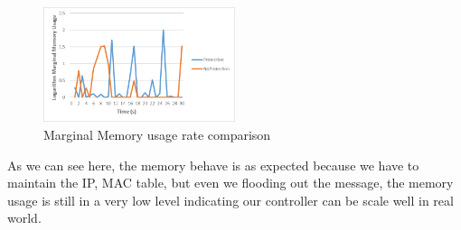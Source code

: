 \documentclass[conference]{IEEEtran}
\begin{document}
\begin{figure}[h!]
\includegraphics[width=0.5\textwidth]{MarginalMemComparison.png}
\caption{Marginal Memory usage rate comparison}
\label{fig:MarginalMemComparison}
\end{figure}
As we can see here, the memory behave is as expected because we have to maintain the IP, MAC table, but even we flooding out the message, the memory usage is still in a very low level indicating our controller can be scale well in real world.
\end{document}
